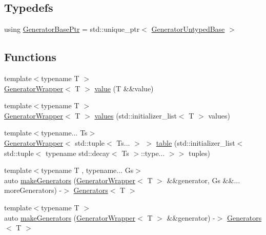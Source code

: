 \subsection*{Typedefs}
\begin{DoxyCompactItemize}
\item 
using \mbox{\hyperlink{namespace_catch_1_1_generators_a1519f304113619d7d18670e2f08276c0}{Generator\+Base\+Ptr}} = std\+::unique\+\_\+ptr$<$ \mbox{\hyperlink{class_catch_1_1_generators_1_1_generator_untyped_base}{Generator\+Untyped\+Base}} $>$
\end{DoxyCompactItemize}
\subsection*{Functions}
\begin{DoxyCompactItemize}
\item 
{\footnotesize template$<$typename T $>$ }\\\mbox{\hyperlink{class_catch_1_1_generators_1_1_generator_wrapper}{Generator\+Wrapper}}$<$ T $>$ \mbox{\hyperlink{namespace_catch_1_1_generators_a3c4989dd0dca44455f55484cedaa18da}{value}} (T \&\&value)
\item 
{\footnotesize template$<$typename T $>$ }\\\mbox{\hyperlink{class_catch_1_1_generators_1_1_generator_wrapper}{Generator\+Wrapper}}$<$ T $>$ \mbox{\hyperlink{namespace_catch_1_1_generators_a55ca9a1132e662d9603c516161dcae35}{values}} (std\+::initializer\+\_\+list$<$ T $>$ values)
\item 
{\footnotesize template$<$typename... Ts$>$ }\\\mbox{\hyperlink{class_catch_1_1_generators_1_1_generator_wrapper}{Generator\+Wrapper}}$<$ std\+::tuple$<$ Ts... $>$ $>$ \mbox{\hyperlink{namespace_catch_1_1_generators_a6e0436ad4eddeabdc34281119201dbfe}{table}} (std\+::initializer\+\_\+list$<$ std\+::tuple$<$ typename std\+::decay$<$ Ts $>$\+::type... $>$$>$ tuples)
\item 
{\footnotesize template$<$typename T , typename... Gs$>$ }\\auto \mbox{\hyperlink{namespace_catch_1_1_generators_a7cc95d72b060e2819b2edbbdbf8c646b}{make\+Generators}} (\mbox{\hyperlink{class_catch_1_1_generators_1_1_generator_wrapper}{Generator\+Wrapper}}$<$ T $>$ \&\&generator, Gs \&\&... more\+Generators) -\/$>$ \mbox{\hyperlink{class_catch_1_1_generators_1_1_generators}{Generators}}$<$ T $>$
\item 
{\footnotesize template$<$typename T $>$ }\\auto \mbox{\hyperlink{namespace_catch_1_1_generators_abefb1a0fab3c669b98a53037b3286d22}{make\+Generators}} (\mbox{\hyperlink{class_catch_1_1_generators_1_1_generator_wrapper}{Generator\+Wrapper}}$<$ T $>$ \&\&generator) -\/$>$ \mbox{\hyperlink{class_catch_1_1_generators_1_1_generators}{Generators}}$<$ T $>$
$$
\end{DoxyCompactItemize}

